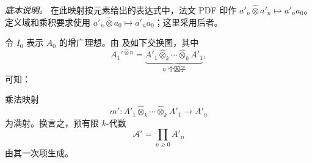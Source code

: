 \label{sga3:VIIB:5.1.4:eq2-source-tensor-note}
\noindent\textit{底本说明。}\enspace
在此映射按元素给出的表达式中，法文 PDF 印作 \(a'_n\widehat\otimes a'_n\mapsto a'_na_0\)。定义域和乘积要求使用 \(a'_n\widehat\otimes a_0\mapsto a'_na_0\)；这里采用后者。

令 \(I_0\) 表示 \(A_0\) 的增广理想。由 \textup{} 及如下交换图，其中
\[
  A_1'{}^{\widehat\otimes n}
  =
  \underbrace{
    A'_1\widehat\otimes_k\cdots\widehat\otimes_kA'_1
  }_{n\text{ 个因子}},
\]
可知：
\begin{center}
  \label{sga3:VIIB:5.1.4:degree-one-generation-diagram}
  
\end{center}
乘法映射
\[
  m':
  A'_1\widehat\otimes_k\cdots\widehat\otimes_kA'_1
  \longrightarrow A'_n
  \tag{3}
  \label{sga3:VIIB:5.1.4:eq3}
\]
为满射。换言之，预有限 \(k\)-代数
\[
  \mathscr A'=\prod_{n\geq0}A'_n
\]
由其一次项生成。
